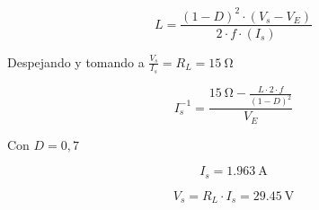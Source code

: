\begin{equation}
	L = \frac{(1 - D)^2 \cdot (V_s - V_E)}{2 \cdot f \cdot (I_s)}
\end{equation}

Despejando y tomando a $\frac{V_s}{I_s} = R_L = \SI{15}{\ohm}$


\begin{equation}
	I_s^{-1} = \frac{\SI{15}{\ohm} - \frac{L \cdot 2 \cdot f}{(1-D)^2}}{V_E}
\end{equation}

Con $D=0,7$

\begin{equation}
	\boxed{I_s = \SI{1,963}{\ampere}}
\end{equation}


\begin{equation}
	\boxed{V_s = R_L \cdot I_s = \SI{29,45}{\volt}}
\end{equation}

